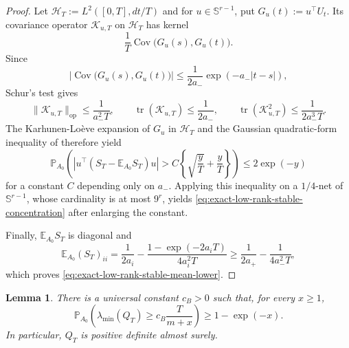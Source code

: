 \documentclass[11pt]{article}
\newtheorem{lemma}[theorem]{Lemma}
\begin{document}
\begin{proof}
Let $\mathcal H_T:=L^2([0,T],dt/T)$ and for $u\in\mathbb S^{r-1}$, put
$G_u(t):=u^\top U_t$. Its covariance operator $\mathcal K_{u,T}$ on
$\mathcal H_T$ has kernel
\[
    \frac1T\operatorname{Cov}\bigl(G_u(s),G_u(t)\bigr).
\]
Since
\[
    \left|\operatorname{Cov}\bigl(G_u(s),G_u(t)\bigr)\right|
    \leq\frac{1}{2a_-}\exp(-a_-|t-s|),
\]
Schur's test gives
\[
    \|\mathcal K_{u,T}\|_{\mathrm{op}}\leq\frac1{a_-^2T},
    \qquad
    \operatorname{tr}(\mathcal K_{u,T})\leq\frac1{2a_-},
    \qquad
    \operatorname{tr}(\mathcal K_{u,T}^2)\leq\frac1{2a_-^3T}.
\]
The Karhunen-Lo\`eve expansion of $G_u$ in $\mathcal H_T$ and the Gaussian
quadratic-form inequality of \cite[Lemma~1]{LaurentMassart2000} therefore yield
\[
    \mathbb P_{A_0}\!\left(
        \left|u^\top(S_T-\mathbb E_{A_0}S_T)u\right|
        >C\left\{\sqrt{\frac{y}{T}}+\frac{y}{T}\right\}
    \right)
    \leq2\exp(-y)
\]
for a constant $C$ depending only on $a_-$. Applying this inequality on a
$1/4$-net of $\mathbb S^{r-1}$, whose cardinality is at most $9^r$, yields
\eqref{eq:exact-low-rank-stable-concentration} after enlarging the constant.

Finally, $\mathbb E_{A_0}S_T$ is diagonal and
\[
    \mathbb E_{A_0}(S_T)_{ii}
    =\frac1{2a_i}
     -\frac{1-\exp(-2a_iT)}{4a_i^2T}
    \geq\frac1{2a_+}-\frac1{4a_-^2T},
\]
which proves \eqref{eq:exact-low-rank-stable-mean-lower}.
\end{proof}

\begin{lemma}%
\label{lem:exact-low-rank-brownian-block}
There is a universal constant $c_B>0$ such that, for every $x\geq1$,
\begin{equation}
    \mathbb P_{A_0}\!\left(
        \lambda_{\min}(Q_T)
        \geq c_B\frac{T}{m+x}
    \right)
    \geq1-\exp(-x).
\label{eq:exact-low-rank-brownian-lower}
\end{equation}
In particular, $Q_T$ is positive definite almost surely.
\end{lemma}
\end{document}
